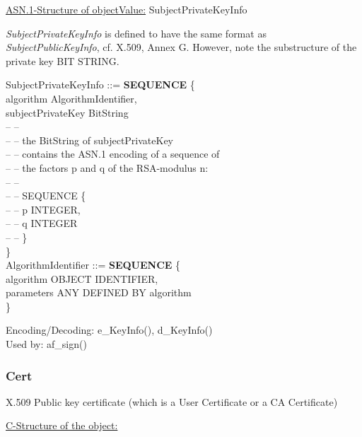 \underline{ASN.1-Structure of objectValue:}
{\small
\bvtab
\4 SubjectPrivateKeyInfo
\evtab
}

{\em SubjectPrivateKeyInfo} is defined to have the same format as
{\em SubjectPublicKeyInfo}, cf. X.509, Annex G.
However, note the substructure of the private key BIT STRING.

{\small
\bvtab
\1 SubjectPrivateKeyInfo ::= \5 {\bf SEQUENCE} \{  \\
\7 algorithm         \2 AlgorithmIdentifier,    \\
\7 subjectPrivateKey BitString            \\
\7 -- -- \\
\7 -- -- the BitString of subjectPrivateKey   \\
\7 -- -- contains the ASN.1 encoding of a sequence of \\
\7 -- -- the factors p and q of the RSA-modulus n:   \\
\7 -- -- \\
\7 -- -- SEQUENCE \{ \\
\7 -- -- \2       p INTEGER,   \\
\7 -- -- \2       q INTEGER  \\
\7 -- -- \} \\
\6 \} \\
\evtab
\bvtab
\1 AlgorithmIdentifier ::= \5 {\bf SEQUENCE} \{    \\
\7 algorithm  \3 OBJECT IDENTIFIER, \\
\7 parameters \3 ANY DEFINED BY algorithm  \\
\6 \}
\evtab
}

Encoding/Decoding: e\_KeyInfo(), d\_KeyInfo() \\
Used by: af\_sign()


\subsubsection{Cert}
X.509 Public key certificate (which is a User Certificate or a CA Certificate) 

\underline{C-Structure of the object:}

